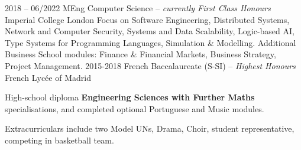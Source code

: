\documentclass[9pt]{developercv}
\begin{document}
    \begin{entrylist}
        \entry
        {2018 -- 06/2022}
        {MEng Computer Science -- \emph{{\small currently} First Class Honours}}
        {Imperial College London}
        {
            Focus on Software Engineering,
            Distributed Systems,
            Network and Computer Security,
            Systems and Data Scalability,
            Logic-based AI,
            Type Systems for Programming Languages,
            Simulation \& Modelling.
%
            Additional Business School modules: Finance \& Financial Markets,
            Business Strategy, Project Management.
        }
        \entry
        {2015-2018}
        {French Baccalaureate (S-SI) --  \emph{Highest Honours}}
        {French Lycée of Madrid}
        {
            High-school diploma \textbf{Engineering Sciences with Further Maths} specialisations,
            and completed optional Portuguese and Music modules.

            Extracurriculars include two Model UNs, Drama, Choir, student representative, competing in
        basketball team.
        }
    \end{entrylist}

\end{document}
